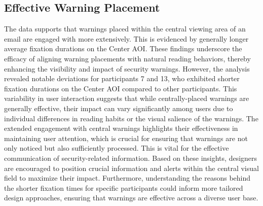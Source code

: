 \documentclass[
  a4paper,  %
  twoside,  %
  bibliography=totoc,
  headsepline,
  cleardoublepage=empty,
  parskip=half,
  draft=false
]{scrbook}
\begin{document}
\subsection{Effective Warning Placement}

The data supports that warnings placed within the central viewing area of an email are engaged with more extensively. This is evidenced by generally longer average fixation durations on the Center AOI. These findings underscore the efficacy of aligning warning placements with natural reading behaviors, thereby enhancing the visibility and impact of security warnings. \newline However, the analysis revealed notable deviations for participants 7 and 13, who exhibited shorter fixation durations on the Center AOI compared to other participants. This variability in user interaction suggests that while centrally-placed warnings are generally effective, their impact can vary significantly among users due to individual differences in reading habits or the visual salience of the warnings. \newline
The extended engagement with central warnings highlights their effectiveness in maintaining user attention, which is crucial for ensuring that warnings are not only noticed but also sufficiently processed. This is vital for the effective communication of security-related information. Based on these insights, designers are encouraged to position crucial information and alerts within the central visual field to maximize their impact. Furthermore, understanding the reasons behind the shorter fixation times for specific participants could inform more tailored design approaches, ensuring that warnings are effective across a diverse user base.
\end{document}

